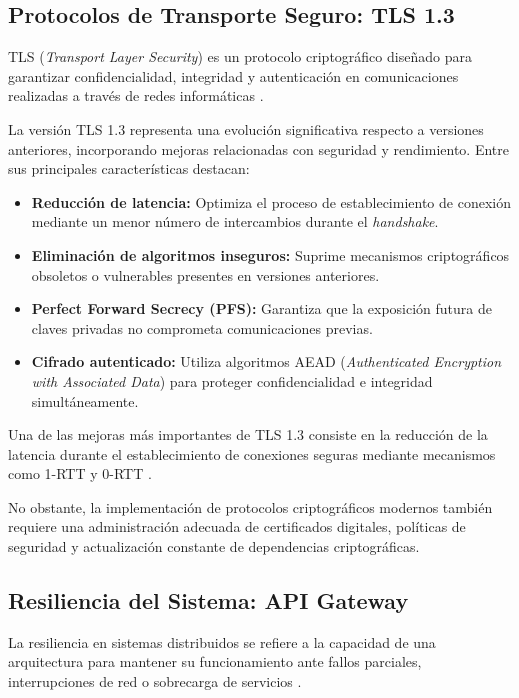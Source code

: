 \subsection{Protocolos de Transporte Seguro: TLS 1.3}

TLS (\textit{Transport Layer Security}) es un protocolo criptográfico diseñado para garantizar confidencialidad, integridad y autenticación en comunicaciones realizadas a través de redes informáticas \cite{55}.

La versión TLS 1.3 representa una evolución significativa respecto a versiones anteriores, incorporando mejoras relacionadas con seguridad y rendimiento. Entre sus principales características destacan:

\begin{itemize}
\item \textbf{Reducción de latencia:} Optimiza el proceso de establecimiento de conexión mediante un menor número de intercambios durante el \textit{handshake}.

\item \textbf{Eliminación de algoritmos inseguros:} Suprime mecanismos criptográficos obsoletos o vulnerables presentes en versiones anteriores.

\item \textbf{Perfect Forward Secrecy (PFS):} Garantiza que la exposición futura de claves privadas no comprometa comunicaciones previas.

\item \textbf{Cifrado autenticado:} Utiliza algoritmos AEAD (\textit{Authenticated Encryption with Associated Data}) para proteger confidencialidad e integridad simultáneamente.
\end{itemize}

Una de las mejoras más importantes de TLS 1.3 consiste en la reducción de la latencia durante el establecimiento de conexiones seguras mediante mecanismos como 1-RTT y 0-RTT \cite{56}.

No obstante, la implementación de protocolos criptográficos modernos también requiere una administración adecuada de certificados digitales, políticas de seguridad y actualización constante de dependencias criptográficas.

\subsection{Resiliencia del Sistema: API Gateway}

La resiliencia en sistemas distribuidos se refiere a la capacidad de una arquitectura para mantener su funcionamiento ante fallos parciales, interrupciones de red o sobrecarga de servicios \cite{58}.

